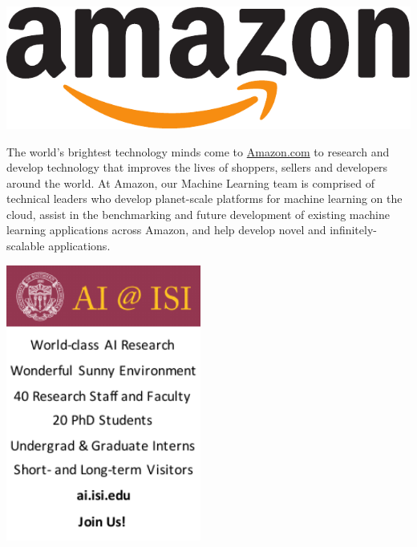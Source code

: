 \begin{center}
\begin{minipage}[b][1\totalheight][t]{0.48\columnwidth}%
\begin{center}
\includegraphics[width=1\textwidth]{content/images/ads/amazon}
\par\end{center}

\large

The world's brightest technology minds come to \url{Amazon.com} to
research and develop technology that improves the lives of shoppers,
sellers and developers around the world. At Amazon, our Machine Learning
team is comprised of technical leaders who develop planet-scale platforms
for machine learning on the cloud, assist in the benchmarking and
future development of existing machine learning applications across
Amazon, and help develop novel and infinitely-scalable applications.%
\end{minipage}\hfill{}\includegraphics[width=0.48\textwidth]{content/images/ads/ai_at_isi}
\par\end{center}

\vfill{}


